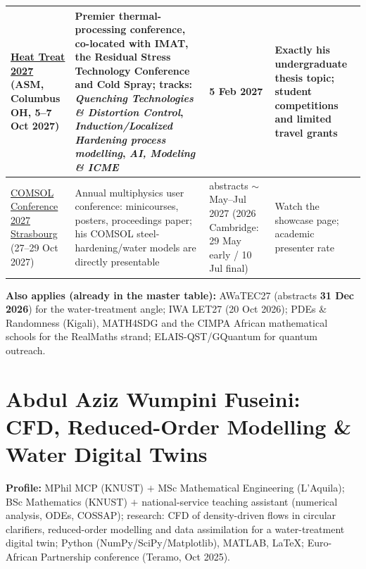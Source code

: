 \documentclass[11pt,a4paper]{article}
\begin{document}
\begin{longtable}{@{}p{3.3cm}p{5.6cm}p{2.2cm}p{2.8cm}@{}}
\href{https://www.asminternational.org/heat-treat-event/cfp}{Heat Treat 2027} (ASM, Columbus OH, 5--7 Oct 2027) & Premier thermal-processing conference, co-located with IMAT, the Residual Stress Technology Conference and Cold Spray; tracks: \emph{Quenching Technologies \& Distortion Control}, \emph{Induction/Localized Hardening process modelling}, \emph{AI, Modeling \& ICME} & \textbf{5 Feb 2027} & Exactly his undergraduate thesis topic; student competitions and limited travel grants \\
\midrule
\href{https://www.comsol.com/events/special/comsol-conference-2027-strasbourg-139292}{COMSOL Conference 2027 Strasbourg} (27--29 Oct 2027) & Annual multiphysics user conference: minicourses, posters, proceedings paper; his COMSOL steel-hardening/water models are directly presentable & abstracts $\sim$May--Jul 2027 (2026 Cambridge: 29 May early / 10 Jul final) & Watch the showcase page; academic presenter rate \\
\bottomrule
\end{longtable}

\noindent\textbf{Also applies (already in the master table):} AWaTEC27 (abstracts \textbf{31 Dec 2026}) for the water-treatment angle; IWA LET27 (20 Oct 2026); PDEs \& Randomness (Kigali), MATH4SDG and the CIMPA African mathematical schools for the RealMaths strand; ELAIS-QST/GQuantum for quantum outreach.

\section{Abdul Aziz Wumpini Fuseini: CFD, Reduced-Order Modelling \& Water Digital Twins}

\noindent \textbf{Profile:} MPhil MCP (KNUST) $+$ MSc Mathematical Engineering (L'Aquila); BSc Mathematics (KNUST) $+$ national-service teaching assistant (numerical analysis, ODEs, COSSAP); research: CFD of density-driven flows in circular clarifiers, reduced-order modelling and data assimilation for a water-treatment digital twin; Python (NumPy/SciPy/Matplotlib), MATLAB, LaTeX; Euro-African Partnership conference (Teramo, Oct 2025).
\end{document}
